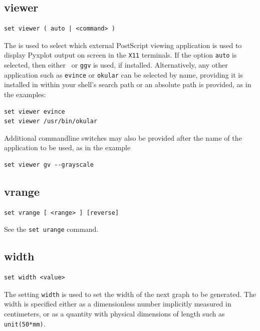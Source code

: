 \subsection{viewer}

\begin{verbatim}
set viewer ( auto | <command> )
\end{verbatim}

The  is used to select which external PostScript viewing
application is used to display Pyxplot output on screen in the {\tt X11}
terminals. If the option {\tt auto} is selected, then either \ghostview\ or
{\tt ggv} is used, if installed. Alternatively, any other application such as
{\tt evince} or {\tt okular} can be selected by name, providing it is installed
in within your shell's search path or an absolute path is provided, as in the
examples:

\begin{verbatim}
set viewer evince
set viewer /usr/bin/okular
\end{verbatim}

\noindent Additional commandline switches may also be provided after the name
of the application to be used, as in the example

\begin{verbatim}
set viewer gv --grayscale
\end{verbatim}


\subsection{vrange}

\begin{verbatim}
set vrange [ <range> ] [reverse]
\end{verbatim}

See the {\tt set urange} command.


\subsection{width}

\begin{verbatim}
set width <value>
\end{verbatim}

The setting {\tt width} is used to set the width of the next graph to be
generated. The width is specified either as a dimensionless number
implicitly measured in centimeters, or as a quantity with physical dimensions
of length such as {\tt unit(50*mm)}.


